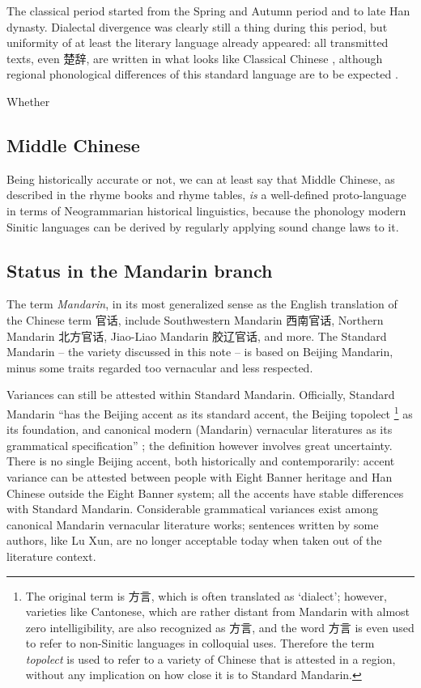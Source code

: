 \documentclass[UTF8, a4paper, oneside, scheme=plain, 12pt]{ctexrep}
\newcommand*{\citepage}[1]{p.~{#1}}
\newcommand*{\term}[1]{\emph{#1}}
\newcommand{\translate}[1]{`#1'}
\begin{document}
The classical period started from the Spring and Autumn period and to late Han dynasty.
Dialectal divergence was clearly still a thing during this period,
but uniformity of at least the literary language already appeared:
all transmitted texts, even 楚辞, are written in what looks like Classical Chinese
\citep[\citepage{447}]{harbsmeier2016irrefutable},
although regional phonological differences of this standard language are to be expected \citep[\citepage{488}]{harbsmeier2016irrefutable}.

Whether 

\subsection{Middle Chinese}

Being historically accurate or not, we can at least say that Middle Chinese, as described in the rhyme books and rhyme tables,
\emph{is} a well-defined proto-language in terms of Neogrammarian historical linguistics,
because the phonology modern Sinitic languages can be derived by regularly applying sound change laws to it.

\subsection{Status in the Mandarin branch}

The term \term{Mandarin}, in its most generalized sense as the English translation 
of the Chinese term 官话, 
include Southwestern Mandarin 西南官话, 
Northern Mandarin 北方官话,
Jiao-Liao Mandarin 胶辽官话, 
and more.
The Standard Mandarin -- the variety discussed in this note -- 
is based on Beijing Mandarin,
minus some traits regarded too vernacular and less respected. 

Variances can still be attested within Standard Mandarin.
Officially, Standard Mandarin 
``has the Beijing accent as its standard accent, 
the Beijing topolect%
\footnote{
    The original term is 方言, 
    which is often translated as \translate{dialect};
    however, varieties like Cantonese, 
    which are rather distant from Mandarin
    with almost zero intelligibility, 
    are also recognized as 方言, 
    and the word 方言 is even used to refer to 
    non-Sinitic languages in colloquial uses.
    Therefore the term \term{topolect} is used 
    to refer to a variety of Chinese that is attested in a region,
    without any implication on how close it is to Standard Mandarin.
} as its foundation,
and canonical modern (Mandarin) vernacular literatures 
as its grammatical specification''
\citep[\citepage{18}]{deng2010formal};
the definition however involves great uncertainty.
There is no single Beijing accent, both historically and contemporarily: 
accent variance can be attested 
between people with Eight Banner heritage and 
Han Chinese outside the Eight Banner system;
all the accents have stable differences with Standard Mandarin.
Considerable grammatical variances exist among 
canonical Mandarin vernacular literature works;
sentences written by some authors, like Lu Xun,
are no longer acceptable today when taken out of 
the literature context. 
\end{document}
